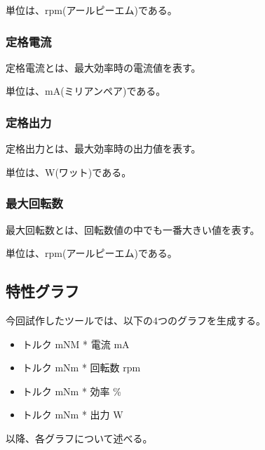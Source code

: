 単位は、rpm(アールピーエム)である。

\subsubsection{定格電流}\label{sub:sub:teikakuden}
定格電流とは、最大効率時の電流値を表す。

単位は、mA(ミリアンペア)である。
\subsubsection{定格出力}\label{sub:sub:teikakusyutu}
定格出力とは、最大効率時の出力値を表す。

単位は、W(ワット)である。
\subsubsection{最大回転数}\label{sub:sub:saidaikai}
最大回転数とは、回転数値の中でも一番大きい値を表す。

単位は、rpm(アールピーエム)である。
\subsection{特性グラフ}\label{sub:tokuseigurahu}
今回試作したツールでは、以下の4つのグラフを生成する。
\begin{itemize}
	\item トルク mNM * 電流 mA
	\item トルク mNm * 回転数 rpm
	\item トルク mNm * 効率 \%
	\item トルク mNm * 出力 W
\end{itemize}
以降、各グラフについて述べる。
